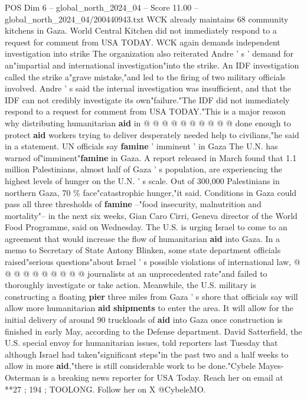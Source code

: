 \begin{textsample}{POS Dim 6 – global\_north\_2024\_04 – Score 11.00 – global\_north\_2024\_04/200440943.txt}
WCK already maintains 68 community kitchens in Gaza.
World Central Kitchen did not immediately respond to a request for comment from USA TODAY.
WCK again demands independent investigation into strike The organization also reiterated Andre ' s ' demand for an"impartial and international investigation"into the strike.
An IDF investigation called the strike a"grave mistake,"and led to the firing of two military officials involved.
Andre ' s said the internal investigation was insufficient, and that the IDF can not credibly investigate its own"failure."The IDF did not immediately respond to a request for comment from USA TODAY."This is a major reason why distributing humanitarian \textbf{aid} in @ @ @ @ @ @ @ @ @ @ done enough to protect \textbf{aid} workers trying to deliver desperately needed help to civilians,"he said in a statement.
UN officials say \textbf{famine} ' imminent ' in Gaza The U.N. has warned of"imminent"\textbf{famine} in Gaza.
A report released in March found that 1.1 million Palestinians, almost half of Gaza ' s population, are experiencing the highest levels of hunger on the U.N. ' s scale.
Out of 300,000 Palestinians in northern Gaza, 70 \% face"catastrophic hunger,"it said.
Conditions in Gaza could pass all three thresholds of \textbf{famine} --"food insecurity, malnutrition and mortality"-- in the next six weeks, Gian Caro Cirri, Geneva director of the World Food Programme, said on Wednesday.
The U.S. is urging Israel to come to an agreement that would increase the flow of humanitarian \textbf{aid} into Gaza.
In a memo to Secretary of State Antony Blinken, some state department officials raised"serious questions"about Israel ' s possible violations of international law, @ @ @ @ @ @ @ @ @ @ journalists at an unprecedented rate"and failed to thoroughly investigate or take action.
Meanwhile, the U.S. military is constructing a floating \textbf{pier} three miles from Gaza ' s shore that officials say will allow more humanitarian \textbf{aid} \textbf{shipments} to enter the area.
It will allow for the initial delivery of around 90 truckloads of \textbf{aid} into Gaza once construction is finished in early May, according to the Defense department.
David Satterfield, the U.S. special envoy for humanitarian issues, told reporters last Tuesday that although Israel had taken"significant steps"in the past two and a half weeks to allow in more \textbf{aid},"there is still considerable work to be done."Cybele Mayes-Osterman is a breaking news reporter for USA Today.
Reach her on email at **27 ; 194 ; TOOLONG.
Follow her on X @CybeleMO.

\end{textsample}
